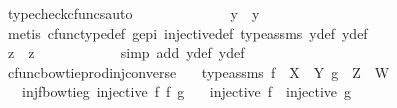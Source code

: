 \begin{isabellebody}
\ {\isacharparenleft}{\kern0pt}typecheck{\isacharunderscore}{\kern0pt}cfuncs{\isacharcomma}{\kern0pt}auto{\isacharparenright}{\kern0pt}\isanewline
\ \ \ \ \ \ \ \ \ \ \isamarkupfalse%
\ \isamarkupfalse%
\ {\isachardoublequoteopen}y{}\ {\isacharequal}{\kern0pt}\ y{}{\isachardoublequoteclose}\isanewline
\ \ \ \ \ \ \ \ \ \ \ \ \isamarkupfalse%
\ {\isacharparenleft}{\kern0pt}metis\ cfunc{\isacharunderscore}{\kern0pt}type{\isacharunderscore}{\kern0pt}def\ g{\isacharunderscore}{\kern0pt}epi\ injective{\isacharunderscore}{\kern0pt}def\ type{\isacharunderscore}{\kern0pt}assms{\isacharparenleft}{\kern0pt}{}{\isacharparenright}{\kern0pt}\ y{}{\isacharunderscore}{\kern0pt}def\ y{}{\isacharunderscore}{\kern0pt}def{\isacharparenright}{\kern0pt}\isanewline
\ \ \ \ \ \ \ \ \isamarkupfalse%
\isanewline
\ \ \ \ \ \ \ \ \isamarkupfalse%
\ \isamarkupfalse%
\ {\isachardoublequoteopen}z{}\ {\isacharequal}{\kern0pt}\ z{}{\isachardoublequoteclose}\isanewline
\ \ \ \ \ \ \ \ \ \ \isamarkupfalse%
\ {\isacharparenleft}{\kern0pt}simp\ add{\isacharcolon}{\kern0pt}\ y{}{\isacharunderscore}{\kern0pt}def\ y{}{\isacharunderscore}{\kern0pt}def{\isacharparenright}{\kern0pt}\isanewline
\ \ \ \ \ \ \isamarkupfalse%
\isanewline
\ \ \ \isamarkupfalse%
\isanewline
\ \isamarkupfalse%
%
\endisatagproof
{\isafoldproof}%
%
\isadelimproof
\isanewline
%
\endisadelimproof
\isanewline
{}\isamarkupfalse%
\ cfunc{\isacharunderscore}{\kern0pt}bowtieprod{\isacharunderscore}{\kern0pt}inj{\isacharunderscore}{\kern0pt}converse{\isacharcolon}{\kern0pt}\isanewline
\ \ \ type{\isacharunderscore}{\kern0pt}assms{\isacharcolon}{\kern0pt}\ {\isachardoublequoteopen}f\ {\isacharcolon}{\kern0pt}\ X\ {\isasymrightarrow}\ Y{\isachardoublequoteclose}\ {\isachardoublequoteopen}g\ {\isacharcolon}{\kern0pt}\ Z\ {\isasymrightarrow}\ W{\isachardoublequoteclose}\isanewline
\ \ \ inj{\isacharunderscore}{\kern0pt}f{\isacharunderscore}{\kern0pt}bowtie{\isacharunderscore}{\kern0pt}g{\isacharcolon}{\kern0pt}\ {\isachardoublequoteopen}injective\ {\isacharparenleft}{\kern0pt}f\ {\isasymbowtie}\isactrlsub f\ g{\isacharparenright}{\kern0pt}{\isachardoublequoteclose}\isanewline
\ \ \ {\isachardoublequoteopen}injective\ f\ {\isasymand}\ injective\ g{\isachardoublequoteclose}\isanewline
%
\isadelimproof

\end{isabellebody}
